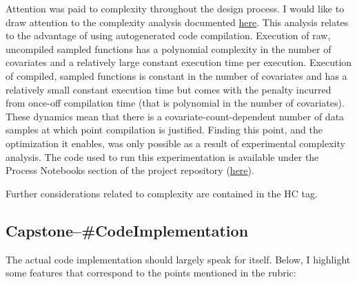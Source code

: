 \documentclass[../main.tex]{subfiles}
\begin{document}
\begin{enumerate}
    Attention was paid to complexity throughout the design process. I would like to draw attention to the complexity analysis documented \href{\RTDurl/advanced/parallelization.html}{here}. This analysis relates to the advantage of using autogenerated code compilation. Execution of raw, uncompiled sampled functions has a polynomial complexity in the number of covariates and a relatively large constant execution time per execution. Execution of compiled, sampled functions is constant in the number of covariates and has a relatively small constant execution time but comes with the penalty incurred from once-off compilation time (that is polynomial in the number of covariates). These dynamics mean that there is a covariate-count-dependent number of data samples at which point compilation is justified. Finding this point, and the optimization it enables, was only possible as a result of experimental complexity analysis. The code used to run this experimentation is available under the Process Notebooks section of the project repository (\href{https://github.com/JoshBroomberg/Maccabee/blob/master/Notebooks/Process\%20Notebooks/Code\%20Compilation\%20Validation.ipynb}{here}).
    
    Further considerations related to complexity are contained in the  HC tag. 
    
\end{enumerate}


\subsection*{\textbf{Capstone--\#CodeImplementation}}
\label{lo:CodeImplementation}

The actual code implementation should largely speak for itself. Below, I highlight some features that correspond to the points mentioned in the rubric:
\end{document}
